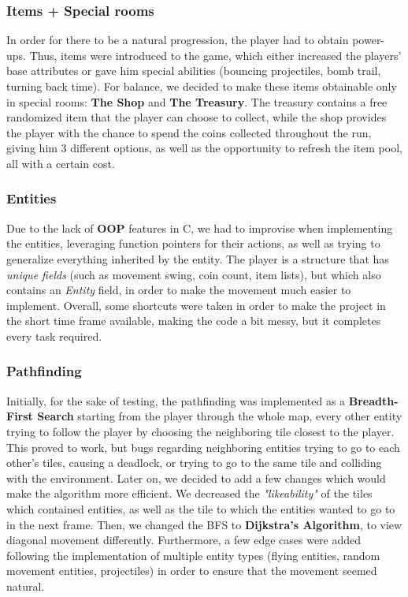 \documentclass{article}
\begin{document}
\subsubsection{Items + Special rooms}
In order for there to be a natural progression, the player had to obtain power-ups. Thus, items were introduced to the game, which either increased the players' base attributes or gave him special abilities (bouncing projectiles, bomb trail, turning back time). For balance, we decided to make these items obtainable only in special rooms: \textbf{The Shop} and \textbf{The Treasury}. The treasury contains a free randomized item that the player can choose to collect, while the shop provides the player with the chance to spend the coins collected throughout the run, giving him 3 different options, as well as the opportunity to refresh the item pool, all with a certain cost.
\subsubsection{Entities}
Due to the lack of \textbf{OOP} features in C, we had to improvise when implementing the entities,
leveraging function pointers for their actions, as well as trying to generalize everything inherited by the entity. The player is a structure that has \textit{unique fields} (such as movement swing, coin count, item lists), but which also contains an \textit{Entity} field, in order to make the movement much easier to implement. Overall, some shortcuts were taken in order to make the project in the short time frame available, making the code a bit messy, but it completes every task required.
\subsubsection{Pathfinding}
Initially, for the sake of testing, the pathfinding was implemented as a \textbf{Breadth-First Search} starting from the player through the whole map, every other entity trying to follow the player by choosing the neighboring tile closest to the player. This proved to work, but bugs regarding neighboring entities trying to go to each other's tiles, causing a deadlock, or trying to go to the same tile and colliding with the environment. Later on, we decided to add a few changes which would make the algorithm more efficient. We decreased the \textit{"likeability"} of the tiles which contained entities, as well as the tile to which the entities wanted to go to in the next frame. Then, we changed the BFS to \textbf{Dijkstra's Algorithm}, to view diagonal movement differently. Furthermore, a few edge cases were added following the implementation of multiple entity types (flying entities, random movement entities, projectiles) in order to ensure that the movement seemed natural.
\end{document}
